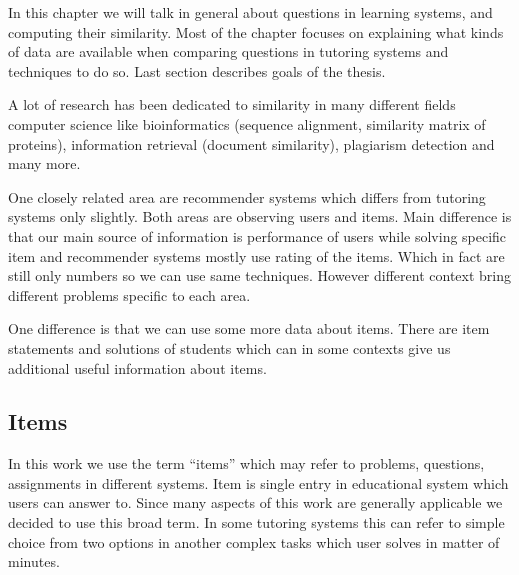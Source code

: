 \documentclass[
  digital, %
  table,   %
  nolof,     %
  nolot,     %
  nocover
]{fithesis3}
\begin{document}



In this chapter we will talk in general about questions in learning
systems, and computing their similarity. Most of the chapter focuses on
explaining what kinds of data are available when comparing questions in
tutoring systems and techniques to do so. Last section describes goals
of the thesis.


A lot of research has been dedicated to similarity in many different
fields computer science like bioinformatics (sequence alignment,
similarity matrix of proteins), information retrieval (document
similarity), plagiarism detection and many more.


One closely related area are recommender systems which differs from tutoring systems only slightly. Both areas are observing users and items. Main difference is that our main source of information is performance of users while solving specific item and recommender systems mostly use rating of the items. Which in fact are still only numbers so we can use same techniques. However different context bring different problems specific to each area.


One difference is that we can use some more data about items. There are item statements and solutions of students which can in some contexts give us additional useful information about items.

\subsection{Items}\label{items}



In this work we use the term ``items'' which may refer to problems, questions,
assignments in different systems. Item is single entry in educational system which
users can answer to. Since many aspects of this work are generally
applicable we decided to use this broad term. In some tutoring systems
this can refer to simple choice from two options in another complex
tasks which user solves in matter of minutes.
\end{document}
